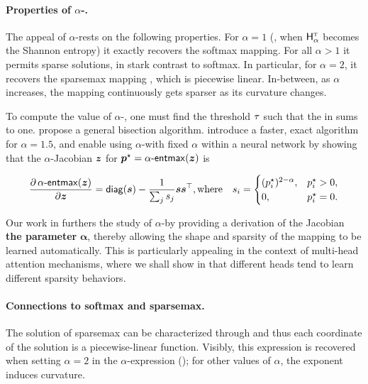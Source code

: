 \paragraph*{Properties of {\boldmath $\alpha$}-\entmaxtext.}
The appeal of $\alpha$-\entmaxtext rests on the
following properties. For $\alpha=1$ (\ie, when $\mathsf{H}^{{\textsc{t}}}_\alpha$ becomes
the Shannon entropy) it exactly recovers the softmax mapping. For all $\alpha>1$
it permits sparse solutions, in stark contrast to softmax. In
particular, for $\alpha=2$, it recovers the sparsemax mapping
\citep{sparsemax}, which is piecewise linear. In-between, as $\alpha$
increases, the mapping continuously gets sparser as its curvature
changes.

To compute the value of $\alpha$-\entmaxtext, one must find the
threshold $\tau$ such that the \rhs in  sums
to one. \citet{blondel2019learning} propose a general bisection
algorithm. \citet{entmax} introduce a faster, exact algorithm for
$\alpha=1.5$, and enable using $\alpha$-\entmaxtext with fixed $\alpha$ within
a neural network by showing that the $\alpha$-\entmaxtext Jacobian
\wrt $\bm{z}$ for $\bm{p}^\star = \mathop{\mathsf{\alpha}\textnormal{-}\mathsf{entmax}}(\bm{z})$ is

\begin{equation}
    \begin{aligned}
        \frac{\partial \mathop{\mathsf{\alpha}\textnormal{-}\mathsf{entmax}}(\bm{z})}{\partial \bm{z}} = \operatorname*{\mathsf{diag}}(\bm{s}) - \frac{1}{\sum_j s_j} \bm{ss}^\top,
        \text{where}\quad s_i = \begin{cases}(p_i^\star)^{2-\alpha}, & p_i^\star > 0, \\
             0,                        & p_i^\star = 0. \\\end{cases}
    \end{aligned}
\end{equation}

Our work in  furthers the study of
$\alpha$-\entmaxtext by providing a derivation of the Jacobian {\bf
        \wrt the parameter} $\boldsymbol{\alpha}$, thereby allowing the shape
and sparsity of the mapping to be learned automatically. This is
particularly appealing in the context of multi-head attention
mechanisms, where we shall show in  that different
heads tend to learn different sparsity behaviors.

\paragraph*{Connections to softmax and sparsemax.}\label{sec:softmax}
The solution of sparsemax can be characterized through 
and thus each coordinate of the solution is a piecewise-linear function.
Visibly, this expression is recovered when setting $\alpha=2$ in the
$\alpha$-\entmaxtext expression (); for other
values of $\alpha$, the exponent induces curvature.

